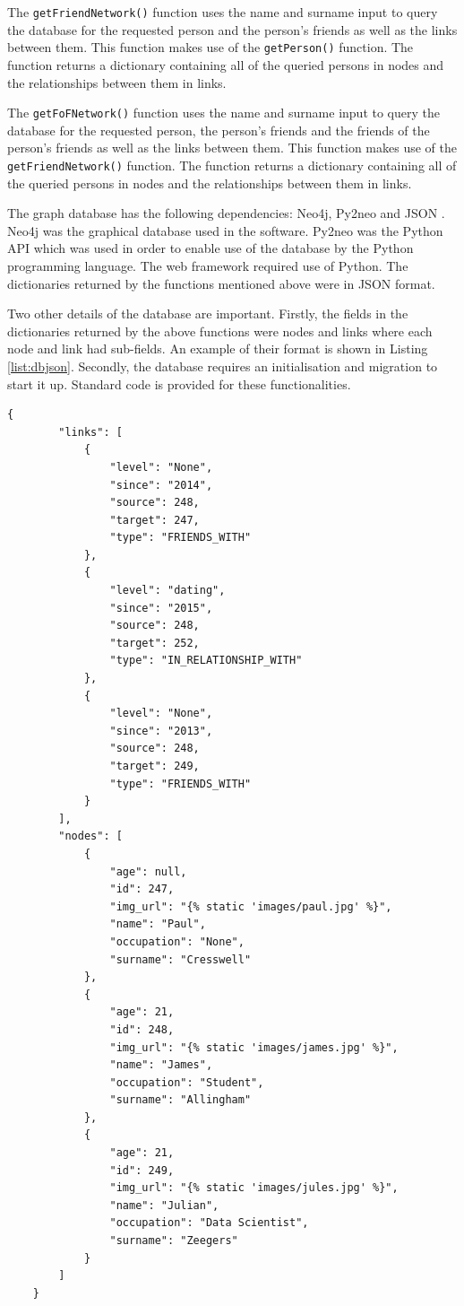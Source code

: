\documentclass[12pt,onecolumn]{article}
\begin{document}
	The \texttt{getFriendNetwork()} function uses the name and surname input to query the database for the requested person and the person's friends as well as the links between them. This function makes use of the \texttt{getPerson()} function. The function returns a dictionary containing all of the queried persons in nodes and the relationships between them in links.
	
	The \texttt{getFoFNetwork()} function uses the name and surname input to query the database for the requested person, the person's friends and the friends of the person's friends as well as the links between them. This function makes use of the \texttt{getFriendNetwork()} function. The function returns a dictionary containing all of the queried persons in nodes and the relationships between them in links.
	
	The graph database has the following dependencies: Neo4j, Py2neo and JSON \cite{neo4j, py2neo, JSON}. Neo4j was the graphical database used in the software. Py2neo was the Python API which was used in order to enable use of the database by the Python programming language. The web framework required use of Python. The dictionaries returned by the functions mentioned above were in JSON format.
	
	Two other details of the database are important. Firstly, the fields in the dictionaries returned by the above functions were nodes and links where each node and link had sub-fields. An example of their format is shown in Listing \ref{list:dbjson}. Secondly, the database requires an initialisation and migration to start it up. Standard code is provided for these functionalities.
	
	\begin{lstlisting}[caption=test,captionpos=b,label=list:dbjson]
	{
	    "links": [
	        {
	            "level": "None", 
	            "since": "2014", 
	            "source": 248, 
	            "target": 247, 
	            "type": "FRIENDS_WITH"
	        }, 
	        {
	            "level": "dating", 
	            "since": "2015", 
	            "source": 248, 
	            "target": 252, 
	            "type": "IN_RELATIONSHIP_WITH"
	        }, 
	        {
	            "level": "None", 
	            "since": "2013", 
	            "source": 248, 
	            "target": 249, 
	            "type": "FRIENDS_WITH"
	        }
	    ], 
	    "nodes": [
	        {
	            "age": null, 
	            "id": 247, 
	            "img_url": "{% static 'images/paul.jpg' %}", 
	            "name": "Paul", 
	            "occupation": "None", 
	            "surname": "Cresswell"
	        }, 
	        {
	            "age": 21, 
	            "id": 248, 
	            "img_url": "{% static 'images/james.jpg' %}", 
	            "name": "James", 
	            "occupation": "Student", 
	            "surname": "Allingham"
	        }, 
	        {
	            "age": 21, 
	            "id": 249, 
	            "img_url": "{% static 'images/jules.jpg' %}", 
	            "name": "Julian", 
	            "occupation": "Data Scientist", 
	            "surname": "Zeegers"
	        }
	    ]
	}

	\end{lstlisting} 
	
\end{document}
